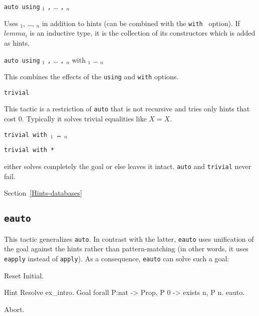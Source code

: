 \begin{coq_example*}
\begin{Variants}
\item \texttt{auto using} $_1$ {\tt ,} {\ldots} {\tt ,} $_n$

  Uses $_1$, \ldots, $_n$ in addition to
  hints (can be combined with the \texttt{with \ident} option). If
  $lemma_i$ is an inductive type, it is the collection of its
  constructors which is added as hints.

\item \texttt{auto using} $_1$ {\tt ,} {\ldots} {\tt ,} $_n$ with \ident$_1$ {\ldots} \ident$_n$

  This combines the effects of the {\tt using} and {\tt with} options.

\item {\tt trivial}

  This tactic is a restriction of {\tt auto} that is not recursive and
  tries only hints that cost 0. Typically it solves trivial
  equalities like $X=X$.

\item \texttt{trivial with \ident$_1$ \dots\ \ident$_n$}

\item \texttt{trivial with *}

\end{Variants}

 either solves completely the goal or else leaves it
intact. \texttt{auto} and \texttt{trivial} never fail.

\SeeAlso Section~\ref{Hints-databases}

\subsection{\tt eauto}
\label{eauto}

This tactic generalizes {\tt auto}. In contrast with
the latter, {\tt eauto} uses unification of the goal
against the hints rather than pattern-matching
(in other words, it uses {\tt eapply} instead of
{\tt apply}).
As a consequence, {\tt eauto} can solve such a goal:

\begin{coq_eval}
Reset Initial.
\end{coq_eval}
\begin{coq_example}
Hint Resolve ex_intro.
Goal forall P:nat -> Prop, P 0 ->  exists n, P n.
eauto.
\end{coq_example}
\begin{coq_eval}
Abort.
\end{coq_eval}


\end{coq_example*}
